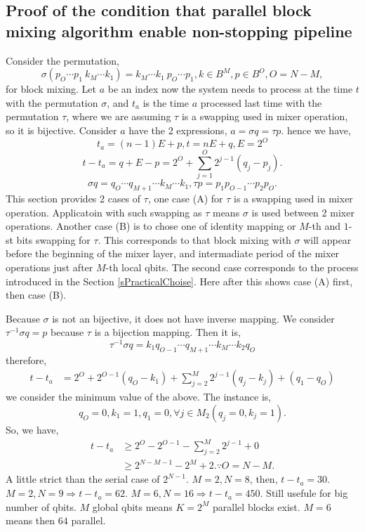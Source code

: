 \documentclass[a4paper]{article}
\begin{document}
\subsection{Proof of the condition that parallel block mixing algorithm enable non-stopping pipeline}
\label{sProofBMANonstop}
Consider the permutation,
\[
\sigma(p_O \cdots p_1\ k_M\cdots k_1) = k_M\cdots k_1\ p_O\cdots p_1, k\in B^M, p\in B^O, O = N-M,
\]
for block mixing. 
Let \(a\) be an index now the system needs to process at the time \(t\) with the permutation \(\sigma\), and \(t_a\) is the time \(a\) processed last time with the permutation \(\tau\), where we are assuming \(\tau\) is a swapping used in mixer operation, so it is bijective. Consider \(a\) have the 2 expressions, \(a = \sigma q = \tau p\). hence we have, 
\[
    t_a = (n-1)E + p, t = n E  + q, E = 2^{O}
\] 
\[
    t - t_a = q + E - p  = 2^O + \sum_{j=1}^O 2^{j-1}(q_j-p_j).
\]
\[
\sigma q = q_O\cdots q_{M+1} \cdots k_M\cdots k_1, \tau p = p_1 p_{O-1}\cdots p_2 p_O.
\]
This section provides 2 cases of \(\tau\), one case (A) for \(\tau\) is a swapping used in mixer operation. Applicatoin with such swapping as \(\tau\) means \(\sigma\) is used between 2 mixer operations. Another case (B) is to chose one of identity mapping or \(M\)-th and \(1\)-st bits swapping for \(\tau\). This corresponds to that block mixing with \(\sigma\) will appear before the beginning of the mixer layer, and intermadiate period of the mixer operations just after \(M\)-th local qbits. The second case corresponds to the process introduced in the Section \ref{sPracticalChoise}. Here after this shows case (A) first, then case (B).

Because \(\sigma\) is not an bijective, it does not have inverse mapping. We consider \(\tau^{-1}\sigma q =  p\) because \(\tau\) is a bijection mapping. Then it is,
\[
 \tau^{-1}\sigma q  = k_1 q_{O-1}\cdots q_{M+1} \cdots k_M\cdots k_2 q_O
\]
therefore, 
\begin{align*}
 t - t_a &= 2^O + 2^{O-1} (q_O - k_1) + \sum_{j=2}^{M} 2^{j-1}(q_j-k_j) + (q_1 - q_O) 
\end{align*}
we consider the minimum value of the above. The instance is, 
\[
q_O = 0, k_1 = 1, q_1 = 0, \forall j\in M_2(q_j = 0, k_j = 1).
\]
So, we have, 
\begin{align*}
 t - t_a &\geq 2^O - 2^{O-1} - \sum_{j=2}^{M} 2^{j-1} + 0 \\
 &\geq 2^{N-M-1} - 2^{M} + 2. \because O = N-M.
\end{align*}
A little strict than the serial case of \(2^{N-1}\). \(M=2, N = 8\), then, \(t - t_a = 30.\) \(M=2, N=9 \Rightarrow t-t_a = 62\). \(M=6, N=16 \Rightarrow t-t_a = 450\). Still usefule for big number of qbits. \(M\) global qbits means \(K=2^M\) parallel blocks exist. \(M=6\) means then \(64\) parallel. 
\end{document}
